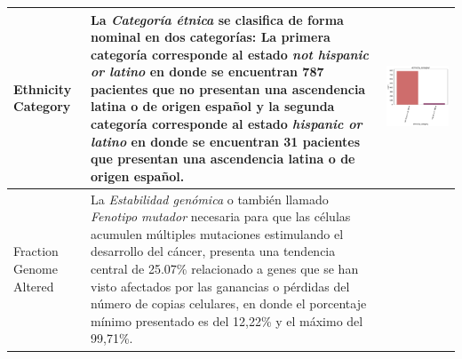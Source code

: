 \begin{table}[!htb]
\begin{threeparttable}
\begin{tabular}{p{2.5cm} p{7cm} p{6.5cm}}
			Ethnicity Category
			&La \textit{Categoría étnica} se clasifica de forma nominal en dos categorías: La primera categoría corresponde al estado \textit{not hispanic or latino} en donde se encuentran 787 pacientes que no presentan una ascendencia latina o de origen español y la segunda categoría corresponde al estado \textit{hispanic or latino} en donde se encuentran 31 pacientes que presentan una ascendencia latina o de origen español.
			& \begin{center}\includegraphics[width=1\linewidth]{NOTEBOOK/IMAGENES_DESCRIPTIVAS/13_ethnicity_category}\end{center}
			\\ \hline
			
			Fraction Genome Altered
			& La \textit{Estabilidad genómica} o también llamado \textit{Fenotipo mutador} necesaria para que las células acumulen múltiples mutaciones estimulando el desarrollo del cáncer, presenta una tendencia central de 25.07\% relacionado a genes que se han visto afectados por las ganancias o pérdidas del número de copias celulares, en donde el porcentaje mínimo presentado es del 12,22\% y el máximo del 99,71\%.
			

\end{tabular}
\end{threeparttable}
\end{table}
